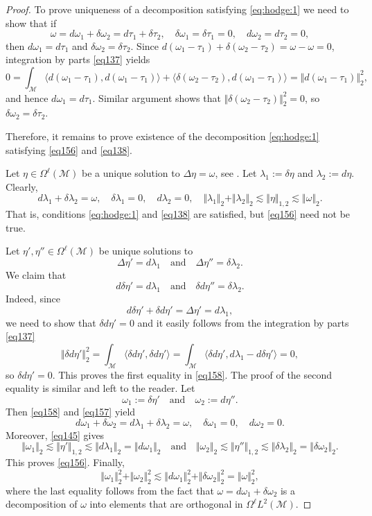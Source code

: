 \documentclass[intlimits,12pt,reqno]{amsart}
\newcommand{\cM}{\mathcal M}
\numberwithin{equation}{section}
\theoremstyle{definition}
\begin{document}
\begin{proof}
To prove uniqueness of a decomposition satisfying \eqref{eq:hodge:1} we need to show that if
$$
\omega = d\omega_1 + \delta \omega_2 =d\tau_1+ \delta\tau_2,
\quad
\delta\omega_1=\delta\tau_1=0,
\quad
d\omega_2=d\tau_2=0,
$$
then $d\omega_1=d\tau_1$ and $\delta\omega_2=\delta\tau_2$.
Since $d(\omega_1-\tau_1)+\delta(\omega_2-\tau_2)=\omega-\omega=0$, integration by parts \eqref{eq137} yields
\[
0=
\int_\cM\langle d(\omega_1-\tau_1),d(\omega_1-\tau_1)\rangle+\langle\delta(\omega_2-\tau_2),d(\omega_1-\tau_1)\rangle
=
\Vert d(\omega_1-\tau_1)\Vert_2^2,
\]
and hence $d\omega_1=d\tau_1$. Similar argument shows that $\Vert\delta(\omega_2-\tau_2)\Vert_2^2=0$, so $\delta\omega_2=\delta\tau_2$.

Therefore, it remains to prove existence of the decomposition \eqref{eq:hodge:1} satisfying \eqref{eq156} and \eqref{eq138}.

Let $\eta\in\Omega^\ell(\cM)$ be a unique solution to $\Delta\eta=\omega$, see . Let $\lambda_1:=\delta\eta$ and $\lambda_2:=d\eta$. Clearly,
\begin{equation}
\label{eq157}
d\lambda_1+\delta\lambda_2=\omega,
\quad
\delta\lambda_1=0,
\quad
d\lambda_2=0,
\quad
\Vert\lambda_1\Vert_2+\Vert\lambda_2\Vert_2\lesssim\Vert\eta\Vert_{1,2}\lesssim\Vert\omega\Vert_2.
\end{equation}
That is, conditions \eqref{eq:hodge:1} and \eqref{eq138} are satisfied, but \eqref{eq156} need not be true.

Let $\eta',\eta''\in\Omega^\ell(\cM)$ be unique solutions to
$$
\Delta\eta'=d\lambda_1
\quad
\text{and}
\quad
\Delta\eta''=\delta\lambda_2.
$$
We claim that
\begin{equation}
\label{eq158}
d\delta\eta'=d\lambda_1
\quad
\text{and}
\quad\delta d\eta''=\delta\lambda_2.
\end{equation}
Indeed, since
$$
d\delta\eta'+\delta d\eta'=\Delta\eta'=d\lambda_1,
$$
we need to show that $\delta d\eta'=0$ and it easily follows from the integration by parts \eqref{eq137}
$$
\Vert\delta d\eta'\Vert_2^2=\int_\cM\langle\delta d\eta',\delta d\eta'\rangle=\int_\cM\langle\delta d\eta',d\lambda_1-d\delta\eta'\rangle=0, 
$$
so $\delta d\eta'=0$. This proves the first equality in \eqref{eq158}. The proof of the second equality is similar and left to the reader.
Let 
$$
\omega_1:=\delta\eta'
\quad
\text{and}
\quad
\omega_2:=d\eta''.
$$
Then \eqref{eq158} and \eqref{eq157} yield
$$
d\omega_1+\delta\omega_2=d\lambda_1+\delta\lambda_2=\omega,
\quad\delta\omega_1=0,
\quad
d\omega_2=0.
$$
Moreover, \eqref{eq145} gives
$$
\Vert\omega_1\Vert_2\lesssim\Vert\eta'\Vert_{1,2}\lesssim\Vert d\lambda_1\Vert_2=\Vert d\omega_1\Vert_2
\quad
\text{and}
\quad
\Vert\omega_2\Vert_2\lesssim\Vert\eta''\Vert_{1,2}\lesssim\Vert\delta\lambda_2\Vert_2=\Vert\delta\omega_2\Vert_2.
$$
This proves \eqref{eq156}. Finally,
$$
\Vert\omega_1\Vert_2^2+\Vert\omega_2\Vert_2^2\lesssim\Vert d\omega_1\Vert_2^2+\Vert\delta\omega_2\Vert_2^2=
\Vert\omega\Vert_2^2,
$$
where the last equality follows from the fact that $\omega=d\omega_1+\delta\omega_2$ is a decomposition of $\omega$ into elements that are orthogonal in $\Omega^\ell L^2(\cM)$.
\end{proof}
\end{document}
